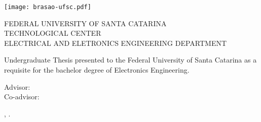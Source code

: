 \begin{titlepage}
  \begin{center}
    \texttt{[image: brasao-ufsc.pdf]}
  \end{center}

  \begin{center}
    {\small FEDERAL UNIVERSITY OF SANTA CATARINA}\\
    {\small TECHNOLOGICAL CENTER}\\
    {\small ELECTRICAL AND ELETRONICS ENGINEERING DEPARTMENT}
  \end{center}

  \vfill

  \begin{center}
    {\LARGE \thetitle}
  \end{center}

  \vfill

  \begin{center}
  Undergraduate Thesis presented to the Federal University of Santa
  Catarina as a requisite for the bachelor degree of Electronics 
  Engineering.
  \end{center}

  \vfill

  \begin{center}
    {\large \theauthor}

    \medskip
    Advisor: \theadvisor\\
    Co-advisor: \thecoadvisor
  \end{center}

  \vfill

  \begin{center}
    \theplace, \thedate.
  \end{center}
\end{titlepage}

\cleardoublepageempty
